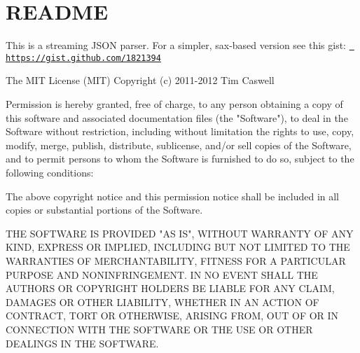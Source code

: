 \chapter{README}
\hypertarget{md__d_1_2_g_i_t_2_food_link_2foodlink_8client_2node__modules_2jsonparse_2_r_e_a_d_m_e}{}\label{md__d_1_2_g_i_t_2_food_link_2foodlink_8client_2node__modules_2jsonparse_2_r_e_a_d_m_e}
This is a streaming JSON parser. For a simpler, sax-\/based version see this gist\+: \href{https://gist.github.com/1821394}{\texttt{ https\+://gist.\+github.\+com/1821394}}

The MIT License (MIT) Copyright (c) 2011-\/2012 Tim Caswell

Permission is hereby granted, free of charge, to any person obtaining a copy of this software and associated documentation files (the "{}\+Software"{}), to deal in the Software without restriction, including without limitation the rights to use, copy, modify, merge, publish, distribute, sublicense, and/or sell copies of the Software, and to permit persons to whom the Software is furnished to do so, subject to the following conditions\+:

The above copyright notice and this permission notice shall be included in all copies or substantial portions of the Software.

THE SOFTWARE IS PROVIDED "{}\+AS IS"{}, WITHOUT WARRANTY OF ANY KIND, EXPRESS OR IMPLIED, INCLUDING BUT NOT LIMITED TO THE WARRANTIES OF MERCHANTABILITY, FITNESS FOR A PARTICULAR PURPOSE AND NONINFRINGEMENT. IN NO EVENT SHALL THE AUTHORS OR COPYRIGHT HOLDERS BE LIABLE FOR ANY CLAIM, DAMAGES OR OTHER LIABILITY, WHETHER IN AN ACTION OF CONTRACT, TORT OR OTHERWISE, ARISING FROM, OUT OF OR IN CONNECTION WITH THE SOFTWARE OR THE USE OR OTHER DEALINGS IN THE SOFTWARE. 